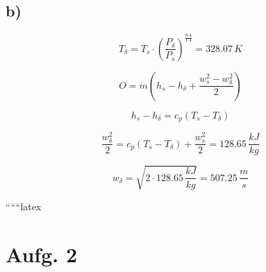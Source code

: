 

\subsection*{b)}

\[
T_{\delta} = T_s \cdot \left( \frac{P_{\delta}}{P_s} \right)^{\frac{0.4}{1.4}} = 328.07 \, K
\]

\[
O = \dot{m} \left( h_s - h_{\delta} + \frac{w_s^2 - w_{\delta}^2}{2} \right)
\]

\[
h_s - h_{\delta} = c_p (T_s - T_{\delta})
\]

\[
\frac{w_{\delta}^2}{2} = c_p (T_s - T_{\delta}) + \frac{w_s^2}{2} = 128.65 \, \frac{kJ}{kg}
\]

\[
w_{\delta} = \sqrt{2 \cdot 128.65 \, \frac{kJ}{kg}} = 507.25 \, \frac{m}{s}
\]

``````latex


\section*{Aufg. 2}